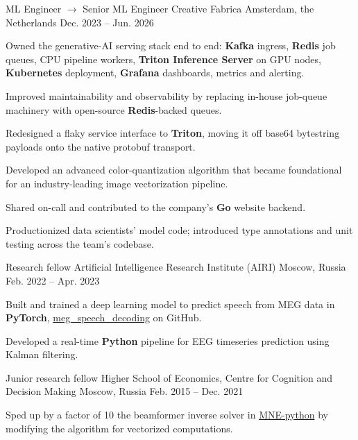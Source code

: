 
\begin{cventries}
  \cventry
    {ML Engineer $\rightarrow$ Senior ML Engineer}
    {Creative Fabrica}
    {Amsterdam, the Netherlands}
    {Dec. 2023 -- Jun. 2026}
    {
      \begin{cvitems}
      \item Owned the generative-AI serving stack end to end: \textbf{Kafka} ingress, \textbf{Redis} job queues, CPU pipeline workers, \textbf{Triton Inference Server} on GPU nodes, \textbf{Kubernetes} deployment, \textbf{Grafana} dashboards, metrics and alerting.
      \item Improved maintainability and observability by replacing in-house job-queue machinery with open-source \textbf{Redis}-backed queues.
      \item Redesigned a flaky service interface to \textbf{Triton}, moving it off base64 bytestring payloads onto the native protobuf transport.
      \item Developed an advanced color-quantization algorithm that became foundational for an industry-leading image vectorization pipeline.
      \item Shared on-call and contributed to the company's \textbf{Go} website backend.
      \item Productionized data scientists' model code; introduced type annotations and unit testing across the team's codebase.
      \end{cvitems}
    }
  \cventry
    {Research fellow}
    {Artificial Intelligence Research Institute (AIRI)}
    {Moscow, Russia}
    {Feb. 2022 -- Apr. 2023}
    {
      \begin{cvitems}
      \item Built and trained a deep learning model to predict speech from MEG data in \textbf{PyTorch}, \href{https://github.com/dmalt/meg_speech_decoding}{meg\_speech\_decoding} on GitHub.
      \item Developed a real-time \textbf{Python} pipeline for EEG timeseries prediction using Kalman filtering.
      \end{cvitems}
    }
  \cventry
    {Junior research fellow}
    {Higher School of Economics, Centre for Cognition and Decision Making}
    {Moscow, Russia}
    {Feb. 2015 -- Dec. 2021}
    {
      \begin{cvitems}
      \item{Sped up by a factor of 10 the beamformer inverse solver in \href{https://github.com/mne-tools/mne-python}{MNE-python} by modifying the algorithm for vectorized computations.}

\end{cvitems}}
\end{cventries}
